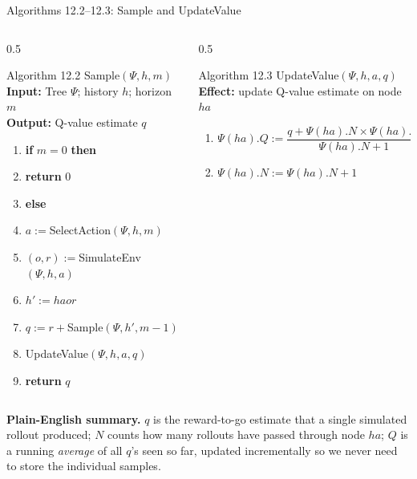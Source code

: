 \documentclass[aspectratio=169,10pt]{beamer}
\begin{document}
\begin{frame}{Algorithms 12.2--12.3: Sample and UpdateValue}
\begin{columns}[T]
\begin{column}{0.5\textwidth}
\begin{block}{Algorithm 12.2 Sample$(\Psi,h,m)$}
\textbf{Input:} Tree $\Psi$; history $h$; horizon $m$\\
\textbf{Output:} Q-value estimate $q$
\footnotesize
\begin{enumerate}
\item[1:] \textbf{if} $m=0$ \textbf{then}
\item[2:] \quad \textbf{return} $0$
\item[3:] \textbf{else}
\item[4:] \quad $a:=$SelectAction$(\Psi,h,m)$
\item[5:] \quad $(o,r):=$SimulateEnv$(\Psi,h,a)$
\item[6:] \quad $h':=haor$
\item[7:] \quad $q:=r+$Sample$(\Psi,h',m-1)$
\item[8:] \quad UpdateValue$(\Psi,h,a,q)$
\item[9:] \textbf{return} $q$
\end{enumerate}
\end{block}
\end{column}
\begin{column}{0.5\textwidth}
\begin{block}{Algorithm 12.3 UpdateValue$(\Psi,h,a,q)$}
\textbf{Effect:} update Q-value estimate on node $ha$
\footnotesize
\begin{enumerate}
\item[1:] $\Psi(ha).Q := \dfrac{q+\Psi(ha).N\times\Psi(ha).Q}{\Psi(ha).N+1}$
\item[2:] $\Psi(ha).N := \Psi(ha).N+1$
\end{enumerate}
\end{block}
\end{column}
\end{columns}
\vspace{0.3cm}
\textbf{Plain-English summary.} $q$ is the reward-to-go estimate that a single simulated
rollout produced; $N$ counts how many rollouts have passed through node $ha$; $Q$ is a
running \emph{average} of all $q$'s seen so far, updated incrementally so we never need to
store the individual samples.
\end{frame}
\end{document}

